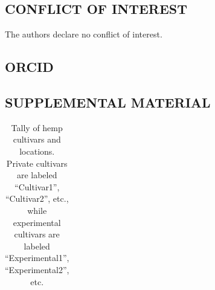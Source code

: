 \documentclass[
]{agujournal2019}
\begin{document}
\subsection{CONFLICT OF INTEREST}\label{conflict-of-interest}

The authors declare no conflict of interest.

\subsection{ORCID}\label{orcid}

\subsection{SUPPLEMENTAL MATERIAL}\label{supplemental-material}

\begin{longtable}[]{@{}lrrrrrr@{}}

\caption{\label{tbl-hemp_provenance}Tally of hemp cultivars and
locations. Private cultivars are labeled ``Cultivar1'', ``Cultivar2'',
etc., while experimental cultivars are labeled ``Experimental1'',
``Experimental2'', etc.}

\tabularnewline


\end{longtable}
\end{document}
